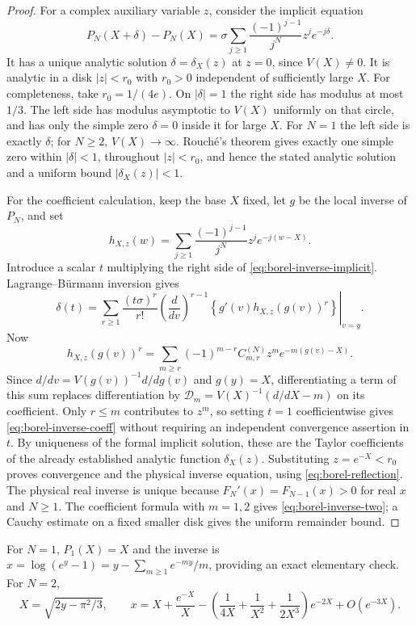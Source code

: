 \documentclass[11pt,a4paper]{article}
\numberwithin{equation}{section}
\theoremstyle{definition}
\theoremstyle{remark}
\begin{document}
\begin{proof}
For a complex auxiliary variable $z$, consider the implicit equation
\begin{equation}\label{eq:borel-inverse-implicit}
 P_N(X+\delta)-P_N(X)
 =\sigma\sum_{j\geq1}\frac{(-1)^{j-1}}{j^N}z^je^{-j\delta}.
\end{equation}
It has a unique analytic solution $\delta=\delta_X(z)$ at $z=0$, since
$V(X)\ne0$. It is analytic in a disk $|z|<r_0$ with $r_0>0$ independent
of sufficiently large $X$. For completeness, take
$r_0=1/(4e)$. On $|\delta|=1$ the right side has modulus at most $1/3$.
The left side has modulus asymptotic to $V(X)$ uniformly on that circle,
and has only the simple zero $\delta=0$ inside it for large $X$.
For $N=1$ the left side is exactly $\delta$; for $N\geq2$,
$V(X)\to\infty$. Rouch\'e's theorem gives exactly one simple zero within
$|\delta|<1$, throughout $|z|<r_0$, and hence the stated analytic
solution and a uniform bound $|\delta_X(z)|<1$.

For the coefficient calculation, keep the base $X$ fixed, let $g$ be
the local inverse of $P_N$, and set
\[
 h_{X,z}(w)=\sum_{j\geq1}\frac{(-1)^{j-1}}{j^N}
               z^je^{-j(w-X)}.
\]
Introduce a scalar $t$ multiplying the right side of
\eqref{eq:borel-inverse-implicit}. Lagrange--B\"urmann inversion gives
\[
 \delta(t)=\sum_{r\geq1}\frac{(t\sigma)^r}{r!}
 \left.
 \left(\frac{d}{dv}\right)^{r-1}
 \left\{g'(v)h_{X,z}(g(v))^r\right\}\right|_{v=y}.
\]
Now
\[
 h_{X,z}(g(v))^r
 =\sum_{m\geq r}(-1)^{m-r}C_{m,r}^{(N)}
                  z^me^{-m(g(v)-X)}.
\]
Since $d/dv=V(g(v))^{-1}d/dg(v)$ and $g(y)=X$, differentiating a term
of this sum replaces differentiation by
$\mathcal D_m=V(X)^{-1}(d/dX-m)$ on its coefficient. Only $r\leq m$
contributes to $z^m$, so setting $t=1$ coefficientwise gives
\eqref{eq:borel-inverse-coeff} without requiring an independent
convergence assertion in $t$. By uniqueness of the formal implicit
solution, these are the Taylor coefficients of the already established
analytic function $\delta_X(z)$.
Substituting $z=e^{-X}<r_0$ proves convergence and the
physical inverse equation, using \eqref{eq:borel-reflection}.
The physical real inverse is unique because
$F_N'(x)=F_{N-1}(x)>0$ for real $x$ and $N\geq1$.
The coefficient formula with $m=1,2$ gives
\eqref{eq:borel-inverse-two}; a Cauchy estimate on a fixed smaller disk
gives the uniform remainder bound.
\end{proof}

For $N=1$, $P_1(X)=X$ and the inverse is
$x=\log(e^y-1)=y-\sum_{m\geq1}e^{-my}/m$, providing an exact elementary
check. For $N=2$,
\[
 X=\sqrt{2y-\pi^2/3},\qquad
 x=X+\frac{e^{-X}}X
 -\left(\frac1{4X}+\frac1{X^2}+\frac1{2X^3}\right)e^{-2X}
 +O(e^{-3X}).
\]
\end{document}
